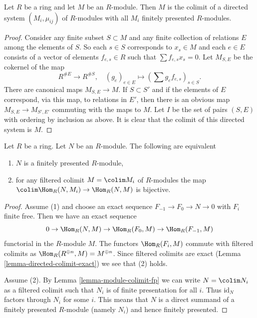 \begin{lemma}
\label{lemma-module-colimit-fp}
Let $R$ be a ring and let $M$ be an $R$-module.
Then $M$ is the colimit of a directed system
$(M_i, \mu_{ij})$ of $R$-modules
with all $M_i$ finitely presented $R$-modules.
\end{lemma}

\begin{proof}
Consider any finite subset $S \subset M$ and any finite
collection of relations $E$ among the elements
of $S$. So each $s \in S$ corresponds to $x_s \in M$ and
each $e \in E$ consists of a vector
of elements $f_{e, s} \in R$ such that $\sum f_{e, s} x_s = 0$.
Let $M_{S, E}$ be the cokernel of the map
$$
R^{\# E} \longrightarrow R^{\# S}, \quad
(g_e)_{e\in E} \longmapsto (\sum g_e f_{e, s})_{s\in S}.
$$
There are canonical maps $M_{S, E} \to M$.
If $S \subset S'$ and if the elements of
$E$ correspond, via this map, to relations
in $E'$, then there is an obvious map
$M_{S, E} \to M_{S', E'}$ commuting with the
maps to $M$. Let $I$ be the set of pairs
$(S, E)$ with ordering by inclusion as above.
It is clear that the colimit of this directed system is $M$.
\end{proof}

\begin{lemma}
\label{lemma-characterize-finitely-presented-module-hom}
Let $R$ be a ring. Let $N$ be an $R$-module. The following are equivalent
\begin{enumerate}
\item $N$ is a finitely presented $R$-module,
\item for any filtered colimit $M = \colim M_i$ of $R$-modules the map
$\colim \Hom_R(N, M_i) \to \Hom_R(N, M)$ is bijective.
\end{enumerate}
\end{lemma}

\begin{proof}
Assume (1) and choose an exact sequence $F_{-1} \to F_0 \to N \to 0$
with $F_i$ finite free. Then we have an exact sequence
$$
0 \to \Hom_R(N, M) \to \Hom_R(F_0, M) \to \Hom_R(F_{-1}, M)
$$
functorial in the $R$-module $M$. The functors $\Hom_R(F_i, M)$ commute
with filtered colimits as $\Hom_R(R^{\oplus n}, M) = M^{\oplus n}$.
Since filtered colimits are exact
(Lemma \ref{lemma-directed-colimit-exact})
we see that (2) holds.

\medskip\noindent
Assume (2). By Lemma \ref{lemma-module-colimit-fp}
we can write $N = \colim N_i$ as a filtered
colimit such that $N_i$ is of finite presentation for all $i$.
Thus $\text{id}_N$ factors through $N_i$ for some $i$.
This means that $N$ is a direct summand of a finitely
presented $R$-module (namely $N_i$) and hence finitely presented.
\end{proof}














